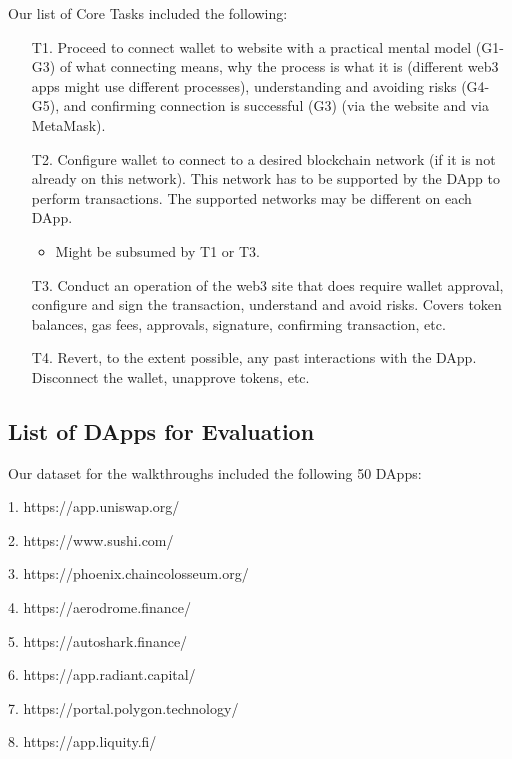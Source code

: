 \documentclass[conference]{IEEEtran}
\begin{document}
\vspace{1em}
\noindent
Our list of Core Tasks included the following:
\begin{enumerate}
	\item[T1.] Proceed to connect wallet to website with a practical mental model (G1-G3) of what connecting means, why the process is what it is (different web3 apps might use different processes), understanding and avoiding risks (G4-G5), and confirming connection is successful (G3) (via the website and via MetaMask).

	\item[T2.] Configure wallet to connect to a desired blockchain network (if it is not already on this network). This network has to be supported by the DApp to perform transactions. The supported networks may be different on each DApp. 
	\begin{itemize}
		\item Might be subsumed by T1 or T3.
	\end{itemize}

	\item[T3.] Conduct an operation of the web3 site that does require wallet approval, configure and sign the transaction, understand and avoid risks. Covers token balances, gas fees, approvals, signature, confirming transaction, etc.

	\item[T4.] Revert, to the extent possible, any past interactions with the DApp. Disconnect the wallet, unapprove tokens, etc. 
\end{enumerate}

\subsection{List of DApps for Evaluation}
\label{app:dapps}

Our dataset for the walkthroughs included the following 50 DApps:

1. https://app.uniswap.org/

2. https://www.sushi.com/

3. https://phoenix.chaincolosseum.org/

4. https://aerodrome.finance/

5. https://autoshark.finance/

6. https://app.radiant.capital/

7. https://portal.polygon.technology/

8. https://app.liquity.fi/
\end{document}

